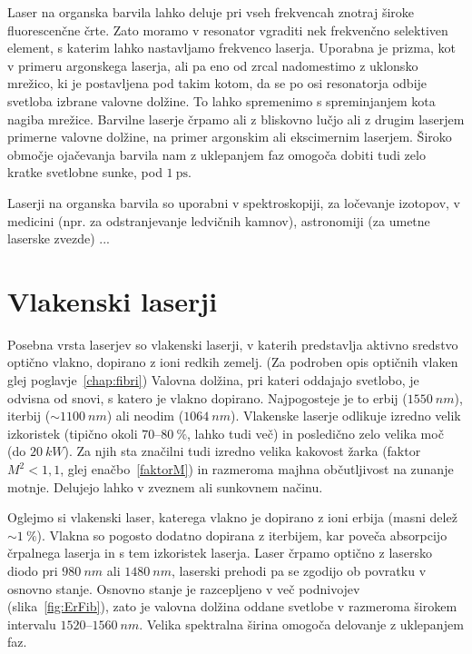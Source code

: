 Laser na organska barvila lahko deluje pri vseh frekvencah znotraj široke
fluorescenčne črte. Zato moramo v resonator vgraditi nek frekvenčno
selektiven element, s katerim lahko nastavljamo frekvenco laserja. Uporabna
je prizma, kot v primeru argonskega laserja, ali pa eno od zrcal nadomestimo 
z uklonsko mrežico, ki je postavljena pod takim kotom, da se po osi resonatorja odbije svetloba
izbrane valovne dolžine. To lahko spremenimo s spreminjanjem kota nagiba mrežice.
Barvilne laserje črpamo ali z bliskovno lučjo ali z drugim laserjem primerne 
valovne dolžine, na primer argonskim ali ekscimernim laserjem. 
Široko območje ojačevanja barvila nam z uklepanjem faz omogoča dobiti
tudi zelo kratke svetlobne sunke, pod $1~\si{\pico\second}$.

Laserji na organska barvila so uporabni v spektroskopiji, za ločevanje izotopov, v 
medicini (npr. za odstranjevanje ledvičnih kamnov), astronomiji (za umetne laserske zvezde) ...
 
\section{Vlakenski laserji}
Posebna vrsta laserjev so vlakenski laserji, v katerih predstavlja aktivno 
sredstvo optično vlakno, dopirano z ioni redkih zemelj. 
(Za podroben opis optičnih vlaken glej poglavje~\ref{chap:fibri})
Valovna dolžina, pri kateri oddajajo svetlobo, je odvisna od snovi, s katero
je vlakno dopirano. Najpogosteje je to erbij ($1550~\si{nm}$),
iterbij ($\sim 1100~\si{nm}$) ali neodim ($1064~\si{nm}$). 
Vlakenske laserje odlikuje
izredno velik izkoristek (tipično okoli $70$--$80~\%$, lahko tudi več) 
in posledično zelo velika moč (do $20~\si{kW}$). Za njih sta značilni tudi
izredno velika kakovost žarka (faktor $M^2<1,1$, glej enačbo~\ref{faktorM}) in 
razmeroma majhna občutljivost na zunanje motnje. Delujejo lahko v zveznem
ali sunkovnem načinu.

Oglejmo si vlakenski laser, katerega vlakno je dopirano z ioni erbija 
(masni delež $\sim 1~\%$). Vlakna so pogosto dodatno dopirana z iterbijem, kar
poveča absorpcijo črpalnega laserja in s tem izkoristek laserja. Laser črpamo
optično z lasersko diodo pri $980~\si{nm}$ ali $1480~\si{nm}$, laserski prehodi 
pa se zgodijo ob povratku v osnovno stanje. Osnovno stanje je razcepljeno v več podnivojev
(slika~\ref{fig:ErFib}), zato je valovna dolžina oddane svetlobe v razmeroma 
širokem intervalu $1520$--$1560~\si{nm}$. Velika spektralna širina
omogoča delovanje z uklepanjem faz. 

